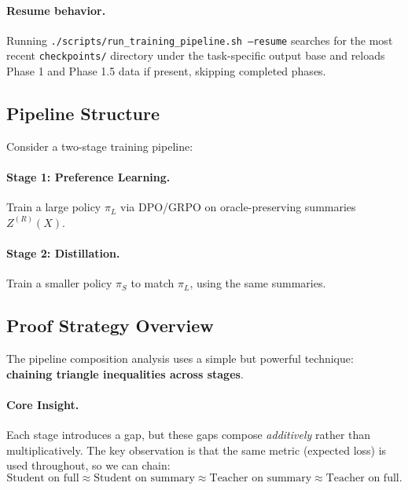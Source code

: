 \paragraph{Resume behavior.}
Running \texttt{./scripts/run\_training\_pipeline.sh --resume} searches for the
most recent \texttt{checkpoints/} directory under the task-specific output base
and reloads Phase 1 and Phase 1.5 data if present, skipping completed phases.

\subsection{Pipeline Structure}

Consider a two-stage training pipeline:

\begin{center}
\end{center}

\paragraph{Stage 1: Preference Learning.}
Train a large policy $\pi_L$ via DPO/GRPO on oracle-preserving summaries $Z^{(R)}(X)$.

\paragraph{Stage 2: Distillation.}
Train a smaller policy $\pi_S$ to match $\pi_L$, using the same summaries.

\subsection{Proof Strategy Overview}

The pipeline composition analysis uses a simple but powerful technique: \textbf{chaining triangle inequalities across stages}.

\paragraph{Core Insight.}
Each stage introduces a gap, but these gaps compose \emph{additively} rather than multiplicatively. The key observation is that the same metric (expected loss) is used throughout, so we can chain:
\[
\text{Student on full} \approx \text{Student on summary} \approx \text{Teacher on summary} \approx \text{Teacher on full}.
\]

